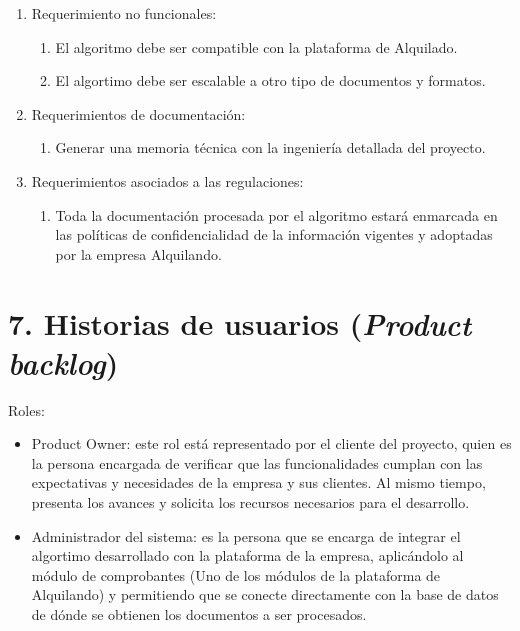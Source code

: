 \documentclass[
11pt, %
]{charter}
\begin{document}
\begin{•}
\begin{enumerate}
\begin{enumerate}
		\end{enumerate}
		
	\item Requerimiento no funcionales:
		\begin{enumerate}
		\item El algoritmo debe ser compatible con la plataforma de Alquilado.
		\item El algortimo debe ser escalable a otro tipo de documentos y formatos.	
		
		\end{enumerate}
		
	\item Requerimientos de documentación:
		\begin{enumerate}
		\item Generar una memoria técnica con la ingeniería detallada del proyecto.		
		\end{enumerate}
	\item Requerimientos asociados a las regulaciones:
		\begin{enumerate}
		\item Toda la documentación procesada por el algoritmo estará enmarcada en las políticas de confidencialidad de la información vigentes y adoptadas por la empresa Alquilando.
		\end{enumerate}
\end{enumerate}



\section{7. Historias de usuarios (\textit{Product backlog})}
\label{sec:backlog}

Roles:
\begin{itemize}

	\item Product Owner: este rol está representado por el cliente del proyecto, quien es la persona encargada de verificar que las funcionalidades cumplan con las expectativas y necesidades de la empresa y sus clientes. Al mismo tiempo, presenta los avances y solicita los recursos necesarios para el desarrollo.
	
	\item Administrador del sistema: es la persona que se encarga de integrar el algortimo desarrollado con la plataforma de la empresa, aplicándolo al módulo de comprobantes (Uno de los módulos de la plataforma de Alquilando) y permitiendo que se conecte directamente con la base de datos de dónde se obtienen los documentos a ser procesados.
	

\end{itemize}
\end{•}
\end{document}
